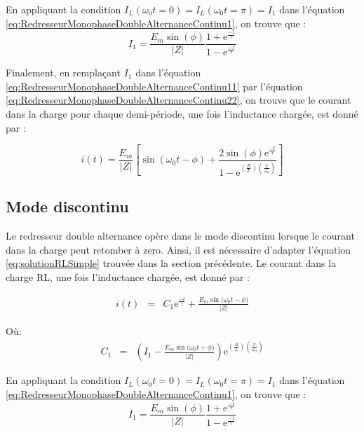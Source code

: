 En appliquant la condition $I_L(\omega_0 t = 0)=I_L(\omega_0 t=\pi)=I_1$ dans l'équation \ref{eq:RedresseurMonophaseDoubleAlternanceContinu1}, on trouve que :
\begin{equation}
\label{eq:RedresseurMonophaseDoubleAlternanceContinu22}
	I_1 = \frac{E_m\sin{(\phi)}}{|Z|}  \frac{1 + \mbox{e}^{\frac{-1}{\tau}}}{1 - \mbox{e}^{\frac{-1}{\tau}}}
\end{equation}

Finalement, en remplaçant $I_1$ dans l'équation \ref{eq:RedresseurMonophaseDoubleAlternanceContinu11} par l'équation \ref{eq:RedresseurMonophaseDoubleAlternanceContinu22}, on trouve que le courant dans la charge pour chaque demi-période, une fois l'inductance chargée, est donné par :

\begin{equation}
	i(t) = \frac{E_m}{|Z|}\left[\sin{(\omega_0 t - \phi)} + \frac{2\sin(\phi) \mbox{e}^{\frac{-t}{\tau}}}{1-\mbox{e}^{\left(\frac{R}{L}\right)\left(\frac{\pi}{\omega_0}\right)}} \right] 
\end{equation}

\subsection{Mode discontinu}
Le redresseur double alternance opère dans le mode discontinu lorsque le courant dans la charge peut retomber à zero. Ainsi, il est nécessaire d'adapter l'équation \ref{eq:solutionRLSimple} trouvée dans la section précédente. Le courant dans la charge RL, une fois l'inductance chargée, est donné par :

\begin{eqnarray}
\label{eq:RedresseurMonophaseDoubleAlternanceContinu1}
i(t) &=& C_1\mbox{e}^{\frac{-t}{\tau}} + \frac{E_m\sin{(\omega_0 t - \phi})}{|Z|}
\end{eqnarray}

Où:
\begin{eqnarray}
C_1 &=& \left( I_1 - \frac{E_m\sin{(\omega_0 t + \phi})}{|Z|}\right)\mbox{e}^{\left(\frac{R}{L}\right)\left(\frac{\pi}{\omega_0}\right)}
\end{eqnarray}

En appliquant la condition $I_L(\omega_0 t = 0)=I_L(\omega_0 t=\pi)=I_1$ dans l'équation \ref{eq:RedresseurMonophaseDoubleAlternanceContinu1}, on trouve que :
\begin{equation}
\label{eq:RedresseurMonophaseDoubleAlternanceContinu2}
	I_1 = \frac{E_m\sin{(\phi)}}{|Z|}  \frac{1 + \mbox{e}^{\frac{-1}{\tau}}}{1 - \mbox{e}^{\frac{-1}{\tau}}}
\end{equation}

